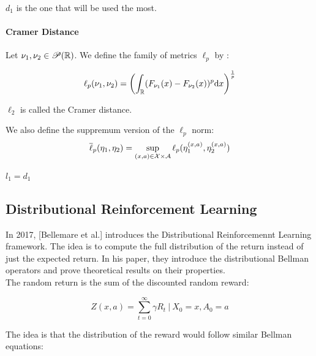 $d_1$ is the one that will be used the most.

\paragraph{Cramer Distance}

\begin{definition}
    Let $\nu_1, \nu_2 \in \mathscr{P}(\mathbb{R})$. We define the family of metrics $\ell_p$ by :

    \[ \ell_p(\nu_1, \nu_2) = \left( \int_{\mathbb{R}} (F_{\nu_1}(x) - F_{\nu_2}(x))^p \mathrm{d} x\right)^{\frac{1}{p}} \]

    $\ell_2$ is called the Cramer distance.

    We also define the suppremum version of the $\ell_p$ norm:
    \[ \overline{\ell}_p(\eta_1,\eta_2) = \sup_{(x,a) \in \mathcal{X} \times \mathcal{A}} \ell_p(\eta_1^{(x,a)}, \eta_2^{(x,a)})\]
\end{definition}

\begin{remark}
    $l_1 = d_1$
\end{remark}





\subsection{Distributional Reinforcement Learning}

In 2017, \cite{bellemare_distributional_2017}[Bellemare et al.] introduces the Distributional Reinforcemennt Learning framework. The idea is to compute the full distribution of the return instead of just the expected return. In his paper, they introduce the distributional Bellman operators and prove theoretical results on their properties.
\\%

The random return is the sum of the discounted random reward:

\begin{equation}
    Z(x,a) = \sum_{t = 0}^{\infty} \gamma R_t \ |\ X_0 = x, A_0 = a
\end{equation}

The idea is that the distribution of the reward would follow similar Bellman equations:

